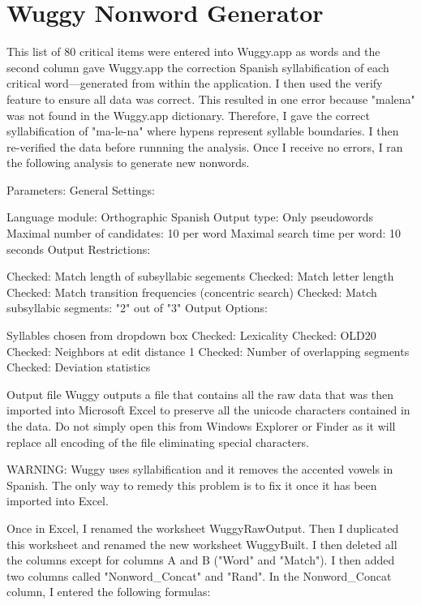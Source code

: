 
\chapter{Wuggy Nonword Generator} %

\label{AppendixA} %

This list of 80 critical items were entered into Wuggy.app as words and the second column gave Wuggy.app the correction Spanish syllabification of each critical word—generated from within the application. I then used the verify feature to ensure all data was correct. This resulted in one error because "malena" was not found in the Wuggy.app dictionary. Therefore, I gave the correct syllabification of "ma-le-na" where hypens represent syllable boundaries. I then re-verified the data before runnning the analysis. Once I receive no errors, I ran the following analysis to generate new nonwords.

Parameters:
General Settings:

Language module: Orthographic Spanish
Output type: Only pseudowords
Maximal number of candidates: 10 per word
Maximal search time per word: 10 seconds
Output Restrictions:

Checked: Match length of subsyllabic segements
Checked: Match letter length
Checked: Match transition frequencies (concentric search)
Checked: Match subsyllabic segments: "2" out of "3"
Output Options:

Syllables chosen from dropdown box
Checked: Lexicality
Checked: OLD20
Checked: Neighbors at edit distance 1
Checked: Number of overlapping segments
Checked: Deviation statistics

Output file
Wuggy outputs a file that contains all the raw data that was then imported into Microsoft Excel to preserve all the unicode characters contained in the data. Do not simply open this from Windows Explorer or Finder as it will replace all encoding of the file eliminating special characters.

WARNING: Wuggy uses syllabification and it removes the accented vowels in Spanish. The only way to remedy this problem is to fix it once it has been imported into Excel.

Once in Excel, I renamed the worksheet WuggyRawOutput. Then I duplicated this worksheet and renamed the new worksheet WuggyBuilt. I then deleted all the columns except for columns A and B ("Word" and "Match"). I then added two columns called "Nonword\_Concat" and "Rand". In the Nonword\_Concat column, I entered the following formulas:

